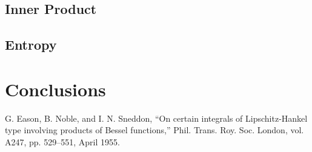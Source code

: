 \documentclass[10pt, conference]{IEEEtran}
\begin{document}
\subsection{Inner Product}
\subsection{Entropy}

\section{Conclusions}

\begin{thebibliography}{00}
 G. Eason, B. Noble, and I. N. Sneddon, ``On certain integrals of Lipschitz-Hankel type involving products of Bessel functions,'' Phil. Trans. Roy. Soc. London, vol. A247, pp. 529--551, April 1955.
\end{thebibliography}

\end{document}
